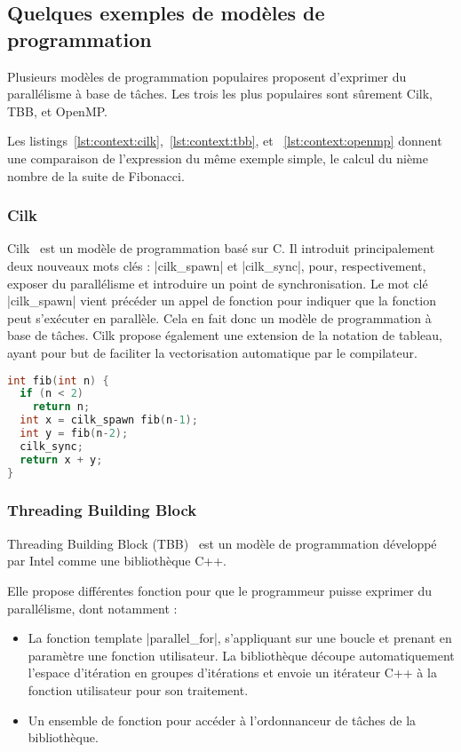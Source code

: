\subsection{Quelques exemples de modèles de programmation}

Plusieurs modèles de programmation populaires proposent d'exprimer du parallélisme à base de tâches.
Les trois les plus populaires sont sûrement Cilk, TBB, et OpenMP.

Les listings~\ref{lst:context:cilk},~\ref{lst:context:tbb}, et ~\ref{lst:context:openmp} donnent une comparaison de l'expression du même exemple simple, le calcul du nième nombre de la suite de Fibonacci.

\subsubsection{Cilk}

Cilk~\cite{cilk5} est un modèle de programmation basé sur C.
Il introduit principalement deux nouveaux mots clés : |cilk_spawn| et |cilk_sync|, pour, respectivement, exposer du parallélisme et introduire un point de synchronisation.
Le mot clé |cilk_spawn| vient précéder un appel de fonction pour indiquer que la fonction peut s'exécuter en parallèle. Cela en fait donc un modèle de programmation à base de tâches.
Cilk propose également une extension de la notation de tableau, ayant pour but de faciliter la vectorisation automatique par le compilateur.


\begin{lstlisting}[language=c++,caption=Fibonacci exprimé en Cilk,label=lst:context:cilk,basicstyle=\small]
int fib(int n) {
  if (n < 2)
    return n;
  int x = cilk_spawn fib(n-1);
  int y = fib(n-2);
  cilk_sync;
  return x + y;
}
\end{lstlisting}


\subsubsection{Threading Building Block}

Threading Building Block (TBB)~\cite{Reinders2007} est un modèle de programmation développé par Intel comme une bibliothèque C++.

Elle propose différentes fonction pour que le programmeur puisse exprimer du parallélisme, dont notamment :
\begin{itemize}
  \item La fonction template |parallel_for|, s'appliquant sur une boucle et prenant en paramètre une fonction utilisateur.
    La bibliothèque découpe automatiquement l'espace d'itération en groupes d'itérations et envoie un itérateur C++ à la fonction utilisateur pour son traitement.
  \item Un ensemble de fonction pour accéder à l'ordonnanceur de tâches de la bibliothèque.
\end{itemize}

